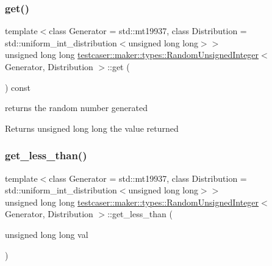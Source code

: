 \subsubsection{\texorpdfstring{get()}{get()}}
{\footnotesize\ttfamily template$<$class Generator = std\+::mt19937, class Distribution = std\+::uniform\+\_\+int\+\_\+distribution$<$unsigned long long$>$$>$ \\
unsigned long long \hyperlink{classtestcaser_1_1maker_1_1types_1_1RandomUnsignedInteger}{testcaser\+::maker\+::types\+::\+Random\+Unsigned\+Integer}$<$ Generator, Distribution $>$\+::get (\begin{DoxyParamCaption}{ }\end{DoxyParamCaption}) const\hspace{0.3cm}{\ttfamily [inline]}}



returns the random number generated 

\begin{DoxyReturn}{Returns}
unsigned long long the value returned 
\end{DoxyReturn}
\mbox{\label{classtestcaser_1_1maker_1_1types_1_1RandomUnsignedInteger_aa13e775f49786618884633ce67aa5d32}} 
\subsubsection{\texorpdfstring{get\+\_\+less\+\_\+than()}{get\_less\_than()}}
{\footnotesize\ttfamily template$<$class Generator = std\+::mt19937, class Distribution = std\+::uniform\+\_\+int\+\_\+distribution$<$unsigned long long$>$$>$ \\
unsigned long long \hyperlink{classtestcaser_1_1maker_1_1types_1_1RandomUnsignedInteger}{testcaser\+::maker\+::types\+::\+Random\+Unsigned\+Integer}$<$ Generator, Distribution $>$\+::get\+\_\+less\+\_\+than (\begin{DoxyParamCaption}\item[{unsigned long long}]{val }\end{DoxyParamCaption})\hspace{0.3cm}{\ttfamily [inline]}}



